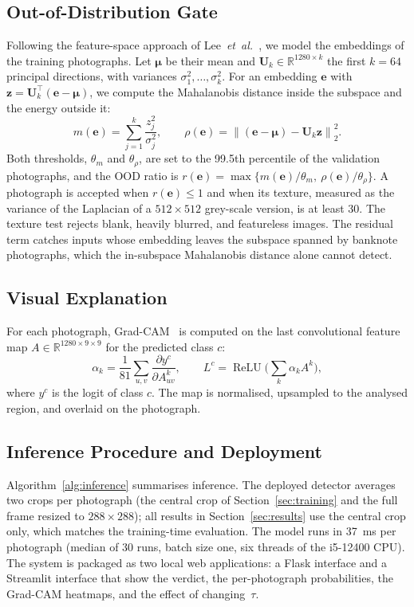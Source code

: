\documentclass[journal]{IEEEtran}
\begin{document}
\subsection{Out-of-Distribution Gate}
\label{sec:ood}
Following the feature-space approach of Lee~\textit{et~al.}~\cite{lee2018mahalanobis},
we model the embeddings of the training photographs. Let $\boldsymbol{\mu}$ be their
mean and $\mathbf{U}_k\in\mathbb{R}^{1280\times k}$ the first $k=64$ principal directions,
with variances $\sigma_1^2,\dots,\sigma_k^2$. For an embedding $\mathbf{e}$ with
$\mathbf{z}=\mathbf{U}_k^{\top}(\mathbf{e}-\boldsymbol{\mu})$, we compute the Mahalanobis
distance inside the subspace and the energy outside it:
\begin{equation}
m(\mathbf{e}) = \sum_{j=1}^{k}\frac{z_j^2}{\sigma_j^2},\qquad
\rho(\mathbf{e}) = \left\lVert(\mathbf{e}-\boldsymbol{\mu})-\mathbf{U}_k\mathbf{z}\right\rVert_2^2 .
\label{eq:ood}
\end{equation}
Both thresholds, $\theta_m$ and $\theta_\rho$, are set to the 99.5th percentile of the
validation photographs, and the OOD ratio is
$r(\mathbf{e})=\max\{m(\mathbf{e})/\theta_m,\ \rho(\mathbf{e})/\theta_\rho\}$. A
photograph is accepted when $r(\mathbf{e})\le1$ and when its texture, measured as the
variance of the Laplacian of a $512\times512$ grey-scale version, is at least 30. The
texture test rejects blank, heavily blurred, and featureless images. The residual term
catches inputs whose embedding leaves the subspace spanned by banknote photographs, which
the in-subspace Mahalanobis distance alone cannot detect.

\subsection{Visual Explanation}
For each photograph, Grad-CAM~\cite{selvaraju2017gradcam} is computed on the last
convolutional feature map $A\in\mathbb{R}^{1280\times9\times9}$ for the predicted class $c$:
\begin{equation}
\alpha_k = \frac{1}{81}\sum_{u,v}\frac{\partial y^{c}}{\partial A^{k}_{uv}},\qquad
L^{c} = \operatorname{ReLU}\!\Big(\sum_{k}\alpha_k A^{k}\Big),
\label{eq:gradcam}
\end{equation}
where $y^c$ is the logit of class $c$. The map is normalised, upsampled to the analysed
region, and overlaid on the photograph.

\subsection{Inference Procedure and Deployment}
Algorithm~\ref{alg:inference} summarises inference. The deployed detector averages two
crops per photograph (the central crop of Section~\ref{sec:training} and the full frame
resized to $288\times288$); all results in Section~\ref{sec:results} use the central crop
only, which matches the training-time evaluation. The model runs in 37~ms per
photograph (median of 30 runs, batch size one, six threads of the i5-12400 CPU). The
system is packaged as two local web applications: a Flask interface and a Streamlit
interface that show the verdict, the per-photograph probabilities, the Grad-CAM heatmaps,
and the effect of changing~$\tau$.
\end{document}
